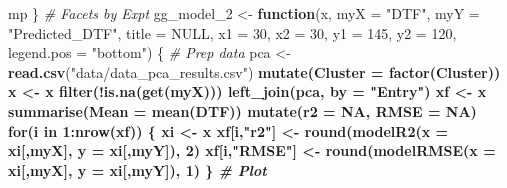 \documentclass[
]{article}
\newenvironment{Shaded}{\begin{snugshade}}{\end{snugshade}}
\newcommand{\CommentTok}[1]{\textcolor[rgb]{0.56,0.35,0.01}{\textit{#1}}}
\newcommand{\ControlFlowTok}[1]{\textcolor[rgb]{0.13,0.29,0.53}{\textbf{#1}}}
\newcommand{\DataTypeTok}[1]{\textcolor[rgb]{0.13,0.29,0.53}{#1}}
\newcommand{\DecValTok}[1]{\textcolor[rgb]{0.00,0.00,0.81}{#1}}
\newcommand{\KeywordTok}[1]{\textcolor[rgb]{0.13,0.29,0.53}{\textbf{#1}}}
\newcommand{\NormalTok}[1]{#1}
\newcommand{\OperatorTok}[1]{\textcolor[rgb]{0.81,0.36,0.00}{\textbf{#1}}}
\newcommand{\OtherTok}[1]{\textcolor[rgb]{0.56,0.35,0.01}{#1}}
\newcommand{\StringTok}[1]{\textcolor[rgb]{0.31,0.60,0.02}{#1}}
\begin{document}
\begin{Shaded}
\begin{Highlighting}[]
{{{{\NormalTok{  mp}
\NormalTok{\}}
\CommentTok{# Facets by Expt}
\NormalTok{gg_model_}\DecValTok{2}\NormalTok{ <-}\StringTok{ }\ControlFlowTok{function}\NormalTok{(x, }\DataTypeTok{myX =} \StringTok{"DTF"}\NormalTok{, }\DataTypeTok{myY =} \StringTok{"Predicted_DTF"}\NormalTok{, }\DataTypeTok{title =} \OtherTok{NULL}\NormalTok{,}
                       \DataTypeTok{x1 =} \DecValTok{30}\NormalTok{, }\DataTypeTok{x2 =} \DecValTok{30}\NormalTok{, }\DataTypeTok{y1 =} \DecValTok{145}\NormalTok{, }\DataTypeTok{y2 =} \DecValTok{120}\NormalTok{, }\DataTypeTok{legend.pos =} \StringTok{"bottom"}\NormalTok{) \{}
  \CommentTok{# Prep data}
\NormalTok{  pca <-}\StringTok{ }\KeywordTok{read.csv}\NormalTok{(}\StringTok{"data/data_pca_results.csv"}\NormalTok{) }\OperatorTok{%
\StringTok{    }\KeywordTok{mutate}\NormalTok{(}\DataTypeTok{Cluster =} \KeywordTok{factor}\NormalTok{(Cluster))}
\NormalTok{  x <-}\StringTok{ }\NormalTok{x }\OperatorTok{%
\StringTok{    }\KeywordTok{filter}\NormalTok{(}\OperatorTok{!}\KeywordTok{is.na}\NormalTok{(}\KeywordTok{get}\NormalTok{(myX))) }\OperatorTok{%
\StringTok{    }\KeywordTok{left_join}\NormalTok{(pca, }\DataTypeTok{by =} \StringTok{"Entry"}\NormalTok{)}
\NormalTok{  xf <-}\StringTok{ }\NormalTok{x }\OperatorTok{%
\StringTok{    }\KeywordTok{summarise}\NormalTok{(}\DataTypeTok{Mean =} \KeywordTok{mean}\NormalTok{(DTF)) }\OperatorTok{%
\StringTok{    }\KeywordTok{mutate}\NormalTok{(}\DataTypeTok{r2 =} \OtherTok{NA}\NormalTok{, }\DataTypeTok{RMSE =} \OtherTok{NA}\NormalTok{)}
  \ControlFlowTok{for}\NormalTok{(i }\ControlFlowTok{in} \DecValTok{1}\OperatorTok{:}\KeywordTok{nrow}\NormalTok{(xf)) \{}
\NormalTok{    xi <-}\StringTok{ }\NormalTok{x }\OperatorTok{%
\NormalTok{    xf[i,}\StringTok{"r2"}\NormalTok{]   <-}\StringTok{ }\KeywordTok{round}\NormalTok{(}\KeywordTok{modelR2}\NormalTok{(}\DataTypeTok{x =}\NormalTok{ xi[,myX],   }\DataTypeTok{y =}\NormalTok{ xi[,myY]), }\DecValTok{2}\NormalTok{)}
\NormalTok{    xf[i,}\StringTok{"RMSE"}\NormalTok{] <-}\StringTok{ }\KeywordTok{round}\NormalTok{(}\KeywordTok{modelRMSE}\NormalTok{(}\DataTypeTok{x =}\NormalTok{ xi[,myX], }\DataTypeTok{y =}\NormalTok{ xi[,myY]), }\DecValTok{1}\NormalTok{)}
\NormalTok{  \}}
  \CommentTok{# Plot}
}}}}}}}}}}
\end{Highlighting}
\end{Shaded}
\end{document}
